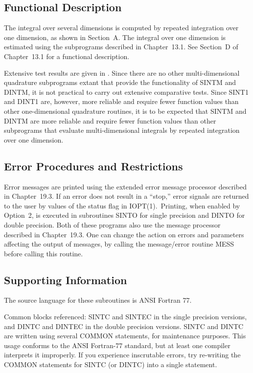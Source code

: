 \documentclass[twoside]{MATH77}
\begin{document}
\subsection{Functional Description}

The integral over several dimensions is computed by repeated integration
over one dimension, as shown in Section~A. The integral over one dimension
is estimated using the subprograms described in Chapter~13.1. See Section~D
of Chapter~13.1 for a functional description.

Extensive test results are given in \cite{Krogh:1978:PTR}.  Since there
are no other multi-dimensional quadrature subprograms extant that provide
the functionality of SINTM and DINTM, it is not practical to carry out
extensive comparative tests.  Since SINT1 and DINT1 are, however, more
reliable and require fewer function values than other one-dimensional
quadrature routines, it is to be expected that SINTM and DINTM are more
reliable and require fewer function values than other subprograms that
evaluate multi-dimensional integrals by repeated integration over one
dimension.




\subsection{Error Procedures and Restrictions}

Error messages are printed using the extended error message processor
described in Chapter~19.3. If an error does not result in a ``stop,'' error
signals are returned to the user by values of the status flag in IOPT(1).\
Printing, when enabled by Option~2, is executed in subroutines SINTO for
single precision and DINTO for double precision. Both of these programs also
use the message processor described in Chapter~19.3. One can change the
action on errors and parameters affecting the output of messages, by calling
the message/error routine MESS before calling this routine.

\subsection{Supporting Information}

The source language for these subroutines is ANSI Fortran 77.

Common blocks referenced: SINTC and SINTEC in the single precision
versions, and DINTC and DINTEC in the double precision versions.
SINTC and DINTC are written using several COMMON statements, for
maintenance purposes. This usage conforms to the ANSI Fortran-77
standard, but at least one compiler interprets it improperly. If you
experience inscrutable errors, try re-writing the COMMON statements
for SINTC (or DINTC) into a single statement.
\end{document}
